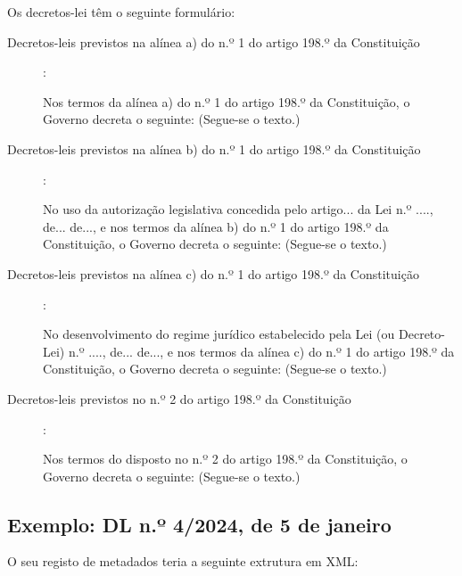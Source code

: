 Os decretos-lei têm o seguinte formulário:

\begin{description}
    \item[Decretos-leis previstos na alínea a) do n.º 1 do artigo 198.º da Constituição]: 
    
    \begin{quoting}
        Nos termos da alínea a) do n.º 1 do artigo 198.º da Constituição, o Governo decreta o seguinte:
        (Segue-se o texto.)
    \end{quoting}

    \item[Decretos-leis previstos na alínea b) do n.º 1 do artigo 198.º da Constituição]: 
    
    \begin{quoting}
        No uso da autorização legislativa concedida pelo artigo... da Lei n.º ...., de... 
        de..., e nos termos da alínea b) do n.º 1 do artigo 198.º da Constituição, 
        o Governo decreta o seguinte:
        (Segue-se o texto.)
    \end{quoting}

    \item[Decretos-leis previstos na alínea c) do n.º 1 do artigo 198.º da Constituição]: 
    
    \begin{quoting}
        No desenvolvimento do regime jurídico estabelecido pela Lei (ou Decreto-Lei) n.º ...., 
        de... de..., e nos termos da alínea c) do n.º 1 do artigo 198.º da Constituição, 
        o Governo decreta o seguinte:
        (Segue-se o texto.)
    \end{quoting}

    \item[Decretos-leis previstos no n.º 2 do artigo 198.º da Constituição]: 
    
    \begin{quoting}
        Nos termos do disposto no n.º 2 do artigo 198.º da Constituição, o Governo decreta o seguinte:
        (Segue-se o texto.)
    \end{quoting}

\end{description}

\subsection{Exemplo: DL n.º 4/2024, de 5 de janeiro} 
    
O seu registo de metadados teria a seguinte extrutura em XML:
    
